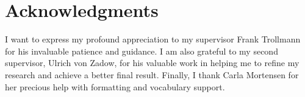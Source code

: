 \section*{Acknowledgments}

I want to express my profound appreciation to my supervisor Frank Trollmann for his invaluable patience and guidance. I am also grateful to my second supervisor, Ulrich von Zadow, for his valuable work in helping me to refine my research and achieve a better final result. Finally, I thank Carla Mortensen for her precious help with formatting and vocabulary support.